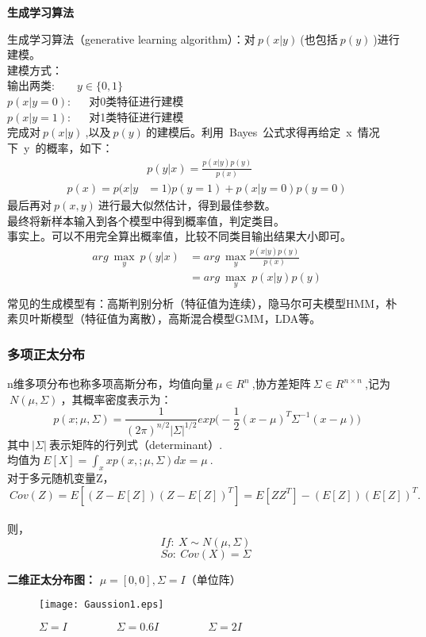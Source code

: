 \noindent\textbf{生成学习算法}\par
生成学习算法（generative learning algorithm）：对$~p(x|y)~$(也包括$~p(y)~$)进行建模。\\
建模方式：\\
输出两类:~~~~$y\in\{0,1\}$\\
$p(x|y=0):$~~~对0类特征进行建模\\
$p(x|y=1):$~~~对1类特征进行建模\\
完成对$~p(x|y)~$,以及$~p(y)~$的建模后。利用~Bayes~公式求得再给定~x~情况下~y~的概率，如下：
\begin{equation}\nonumber
\begin{split}
  &p(y|x)=\frac{p(x|y)p(y)}{p(x)}\\
  p(x)=p(x|y&=1)p(y=1)+p(x|y=0)p(y=0)
\end{split}
\end{equation}
最后再对$~p(x,y)~$进行最大似然估计，得到最佳参数。\\
最终将新样本输入到各个模型中得到概率值，判定类目。\\
事实上。可以不用完全算出概率值，比较不同类目输出结果大小即可。
\begin{equation}\nonumber
\begin{split}
  arg~\mathop{max}_y~p(y|x)&=arg~\mathop{max}_y\frac{p(x|y)p(y)}{p(x)}\\
  &=arg~\mathop{max}_y~p(x|y)p(y)\\
\end{split}
\end{equation}
常见的生成模型有：高斯判别分析（特征值为连续），隐马尔可夫模型HMM，朴素贝叶斯模型（特征值为离散），高斯混合模型GMM，LDA等。

\subsubsection{多项正太分布}
n维多项分布也称多项高斯分布，均值向量$~\mu\in R^n~$,协方差矩阵$~\Sigma\in R^{n\times n}~$,记为$~N(\mu,\Sigma)~$，其概率密度表示为：$$p(x;\mu,\Sigma)=\frac{1}{(2\pi)^{n/2}|\Sigma|^{1/2}}exp\Big(-\frac{1}{2}(x-\mu)^T\Sigma^{-1}(x-\mu)\Big)$$
其中$~|\Sigma|~$表示矩阵的行列式（determinant）.\\
均值为$~E[X]=\displaystyle \int_xxp(x,;\mu,\Sigma)dx=\mu~$.\\
对于多元随机变量Z，$$~Cov(Z)=E[(Z-E[Z])(Z-E[Z])^T]=E[ZZ^T]-(E[Z])(E[Z])^T.~$$\\
则，$$If:~X\sim N(\mu,\Sigma)~$$$$So:~Cov(X)=\Sigma~$$

\noindent\textbf{二维正太分布图：} $\mu=[0,0],\Sigma=I$（单位阵）
\begin{figure}[!h]
  \centering
  \texttt{[image: Gaussion1.eps]}
  \caption{$\Sigma=I~~~~~~~~~~~~~~~~~~~~\Sigma=0.6I~~~~~~~~~~~~~~~~~~~~\Sigma=2I$}
\end{figure}

